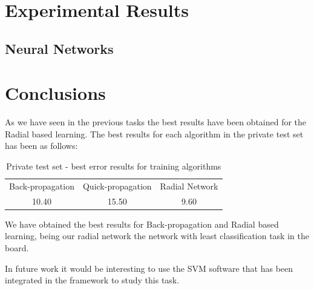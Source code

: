 \documentclass[a4paper,10pt,titlepage]{article}
\begin{document}
\section{Experimental Results}
\subsection{Neural Networks}


\section{Conclusions}

\par As we have seen in the previous tasks the best results have been obtained for the Radial based learning. The best results for each algorithm in the private test set has been as follows: 

\begin{table}[H] 
\caption{Private test set - best error results for training algorithms} %
\centering 
\begin{tabular}{c c c} 
\hline\hline 
Back-propagation & Quick-propagation & Radial Network \\
10.40 & 15.50 &  9.60 \\

\hline 
\end{tabular} 
\label{tab:dist_result} 
\end{table}

\par We have obtained the best results for Back-propagation and Radial based learning, being our radial network the network with least classification task in the board.

\par In future work it would be interesting to use the SVM software that has been integrated in the framework to study this task.  
\end{document}
